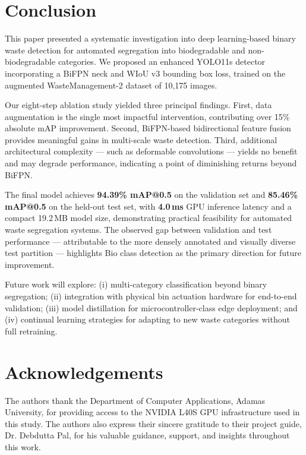 \documentclass[runningheads]{llncs}
\begin{document}
\section{Conclusion}
\label{sec:conclusion}

This paper presented a systematic investigation into deep
learning-based binary waste detection for automated segregation
into biodegradable and non-biodegradable categories. We proposed an
enhanced YOLO11s detector incorporating a BiFPN neck and WIoU v3
bounding box loss, trained on the augmented WasteManagement-2
dataset of 10,175 images.

Our eight-step ablation study yielded three principal findings. First,
data augmentation is the single most impactful intervention,
contributing over 15\% absolute mAP improvement. Second, BiFPN-based
bidirectional feature fusion provides meaningful gains in multi-scale
waste detection. Third, additional architectural complexity — such as
deformable convolutions — yields no benefit and may degrade
performance, indicating a point of diminishing returns beyond BiFPN.

The final model achieves \textbf{94.39\% mAP@0.5} on the validation
set and \textbf{85.46\% mAP@0.5} on the held-out test set, with
\textbf{4.0\,ms} GPU inference latency and a compact 19.2\,MB model
size, demonstrating practical feasibility for automated waste
segregation systems. The observed gap between validation and test
performance — attributable to the more densely annotated and visually
diverse test partition — highlights Bio class detection as the primary
direction for future improvement.

Future work will explore: (i) multi-category classification beyond
binary segregation; (ii) integration with physical bin actuation
hardware for end-to-end validation; (iii) model distillation for
microcontroller-class edge deployment; and (iv) continual learning
strategies for adapting to new waste categories without full
retraining.

\section*{Acknowledgements}
The authors thank the Department of Computer Applications, Adamas University,
for providing access to the NVIDIA L40S GPU infrastructure used in this study.
The authors also express their sincere gratitude to their project guide,
Dr. Debdutta Pal, for his valuable guidance, support, and insights
throughout this work.
\end{document}
